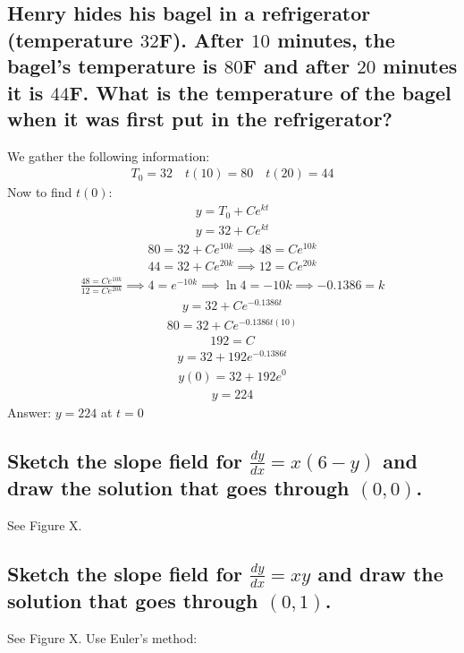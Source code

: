 \documentclass{article}
\begin{document}
\subsection{Henry hides his bagel in a refrigerator (temperature $32$F). After $10$ minutes, the bagel's temperature is $80$F and after $20$ minutes it is $44$F. What is the temperature of the bagel when it was first put in the refrigerator?}
We gather the following information:
\begin{align*}
	T_0 = 32 \quad t(10) = 80 \quad t(20) = 44
\end{align*}
Now to find $t(0)$:
\begin{align*}
	y = T_0 + Ce^{kt}
\end{align*}
\begin{align*}
	y = 32 + Ce^{kt}
\end{align*}
\begin{align*}
	80 = 32 + Ce^{10k} \implies 48 = Ce^{10k}
\end{align*}
\begin{align*}
	44 = 32 + Ce^{20k} \implies 12 = Ce^{20k}
\end{align*}
\begin{align*}
	\frac{48 = Ce^{10k}}{12 = Ce^{20k}} \implies 4 = e^{-10k} \implies \ln{4} = -10k \implies -0.1386 = k
\end{align*}
\begin{align*}
	y = 32 + Ce^{-0.1386t}
\end{align*}
\begin{align*}
	80 = 32 + Ce^{-0.1386t(10)}
\end{align*}
\begin{align*}
	192 = C
\end{align*}
\begin{align*}
	y = 32 + 192e^{-0.1386t}
\end{align*}
\begin{align*}
	y(0) = 32 + 192e^0
\end{align*}
\begin{align*}
	y = 224
\end{align*}
Answer: $y = 224$ at $t = 0$

\subsection{Sketch the slope field for $\frac{dy}{dx} = x(6 - y)$ and draw the solution that goes through $(0, 0)$.}
See Figure X.

\subsection{Sketch the slope field for $\frac{dy}{dx} = xy$ and draw the solution that goes through $(0, 1)$.}
See Figure X.
Use Euler's method:
\end{document}
